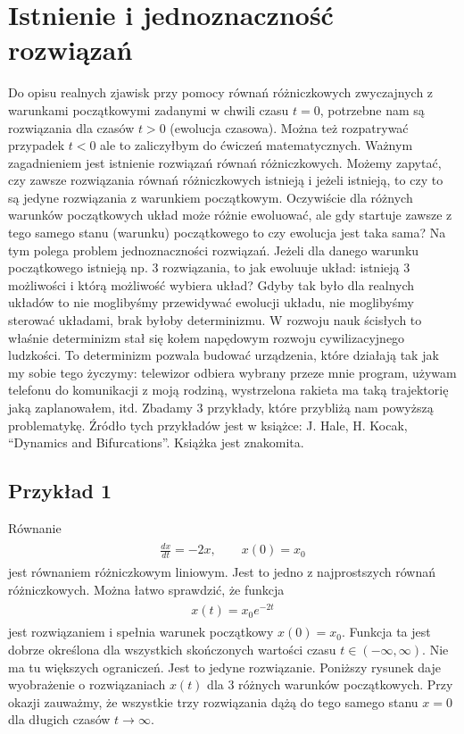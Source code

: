 \documentclass[a4paper,12pt,polish]{sphinxmanual}
\begin{document}
\section{Istnienie i jednoznaczność rozwiązań}
\label{ch1/chI012:istnienie-i-jednoznacznosc-rozwiazan}\label{ch1/chI012::doc}
Do opisu  realnych zjawisk przy pomocy równań różniczkowych zwyczajnych z warunkami początkowymi zadanymi w chwili  czasu $t=0$, potrzebne nam są rozwiązania dla czasów $t>0$ (ewolucja czasowa).  Można też rozpatrywać przypadek $t<0$ ale to zaliczyłbym do ćwiczeń matematycznych.  Ważnym zagadnieniem jest istnienie rozwiązań równań różniczkowych. Możemy zapytać, czy zawsze rozwiązania równań różniczkowych istnieją i jeżeli istnieją, to czy to są jedyne rozwiązania z warunkiem początkowym. Oczywiście dla różnych warunków początkowych układ może różnie ewoluować, ale gdy startuje  zawsze z tego samego  stanu (warunku) początkowego to czy ewolucja jest taka sama? Na tym polega problem jednoznaczności rozwiązań. Jeżeli dla danego warunku początkowego istnieją  np. 3 rozwiązania, to jak ewoluuje układ: istnieją 3 możliwości i którą możliwość wybiera układ? Gdyby tak było dla realnych układów to nie moglibyśmy przewidywać ewolucji układu, nie moglibyśmy sterować układami, brak byłoby determinizmu.  W rozwoju nauk ścisłych to właśnie determinizm stał się kołem napędowym rozwoju cywilizacyjnego ludzkości. To determinizm pozwala budować urządzenia, które działają tak jak my sobie tego życzymy: telewizor odbiera wybrany przeze mnie program, używam telefonu do komunikacji  z moją rodziną, wystrzelona rakieta ma taką trajektorię jaką zaplanowałem, itd.  Zbadamy 3 przykłady, które przybliżą nam powyższą problematykę. Źródło tych przykładów jest w  książce: J. Hale, H. Kocak, ``Dynamics and Bifurcations''. Książka jest znakomita.


\subsection{Przykład 1}
\label{ch1/chI012:przyklad-1}
Równanie
\label{ch1/chI012:equation-eqn1}\begin{gather}
\begin{split}\frac{dx}{dt}=-2x, \qquad x(0) = x_0\end{split}\label{ch1/chI012-eqn1}
\end{gather}
jest równaniem różniczkowym liniowym. Jest to jedno z najprostszych równań różniczkowych.  Można łatwo sprawdzić, że funkcja
\label{ch1/chI012:equation-eqn2}\begin{gather}
\begin{split}x(t) = x_0   e^{-2t}\end{split}\label{ch1/chI012-eqn2}
\end{gather}
jest rozwiązaniem i spełnia warunek początkowy $x(0) = x_0$. Funkcja ta jest dobrze określona dla wszystkich skończonych  wartości czasu $t \in (-\infty, \infty)$.  Nie ma tu większych ograniczeń.  Jest to jedyne rozwiązanie.  Poniższy rysunek daje wyobrażenie o rozwiązaniach $x(t)$ dla 3 różnych warunków początkowych. Przy okazji zauważmy, że wszystkie trzy rozwiązania dążą do tego samego stanu $x=0$  dla długich czasów $t\to \infty$.
\end{document}

